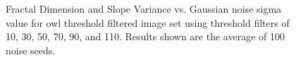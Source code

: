 \documentclass[12pt, oneside]{book}
\begin{document}
\begin{figure}[!b]
  \centering
  \caption[Fractal Dimension and Slope Variance vs. Gaussian noise sigma value for owl threshold filtered image set]{Fractal Dimension and Slope Variance vs. Gaussian noise sigma value for owl threshold filtered image set using threshold filters of 10, 30, 50, 70, 90, and 110.  Results shown are the average of 100 noise seeds.}
  \label{fig:owl-thresh_gaussian_multi_result}
\end{figure}


\clearpage
\end{document}
